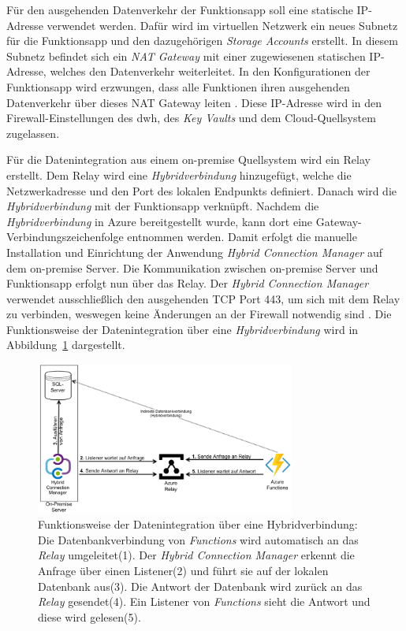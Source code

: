 Für den ausgehenden Datenverkehr der Funktionsapp soll eine statische IP-Adresse verwendet werden. Dafür wird im virtuellen Netzwerk ein neues Subnetz für die Funktionsapp und den dazugehörigen \textit{Storage Accounts} erstellt. In diesem Subnetz befindet sich ein \textit{NAT Gateway} mit einer zugewiesenen statischen IP-Adresse, welches den Datenverkehr weiterleitet. In den Konfigurationen der Funktionsapp wird erzwungen, dass alle Funktionen ihren ausgehenden Datenverkehr über dieses NAT Gateway leiten \cite[vgl.][]{msdoc_22_func_ip}. Diese IP-Adresse wird in den Firewall-Einstellungen des \ac{dwh}, des \textit{Key Vaults} und dem Cloud-Quellsystem zugelassen.

Für die Datenintegration aus einem on-premise Quellsystem wird ein Relay erstellt. Dem Relay wird eine \textit{Hybridverbindung} hinzugefügt, welche die Netzwerkadresse und den Port des lokalen Endpunkts definiert. Danach wird die \textit{Hybridverbindung} mit der Funktionsapp verknüpft. Nachdem die \textit{Hybridverbindung} in Azure bereitgestellt wurde, kann dort eine Gateway-Verbindungszeichenfolge entnommen werden. Damit erfolgt die manuelle Installation und Einrichtung der Anwendung \textit{Hybrid Connection Manager} auf dem on-premise Server. Die Kommunikation zwischen on-premise Server und Funktionsapp erfolgt nun über das Relay. Der \textit{Hybrid Connection Manager} verwendet ausschließlich den ausgehenden TCP Port 443, um sich mit dem Relay zu verbinden, weswegen keine Änderungen an der Firewall notwendig sind \cite[vgl.][]{msdoc_22_func_hybridConn}. Die Funktionsweise der Datenintegration über eine \textit{Hybridverbindung} wird in Abbildung~\ref{fig:chap04_hybridConn} dargestellt.

 \begin{figure}[htbp]
 \centering
 \includegraphics[width=0.76\textwidth]{gfx/azure/hybridverbindung.pdf}
 \caption[Datenintegration über Hybridverbindung]{Funktionsweise der Datenintegration über eine Hybridverbindung: Die Datenbankverbindung von \textit{Functions} wird automatisch an das \textit{Relay} umgeleitet(1). Der \textit{Hybrid Connection Manager} erkennt die Anfrage über einen Listener(2) und führt sie auf der lokalen Datenbank aus(3). Die Antwort der Datenbank wird zurück an das \textit{Relay} gesendet(4). Ein Listener von \textit{Functions} sieht die Antwort und diese wird gelesen(5). \cite[vgl.][]{msdoc_22_func_hybridConn, msdoc_21_hybridConn_protocol}}
\label{fig:chap04_hybridConn}
\end{figure}

